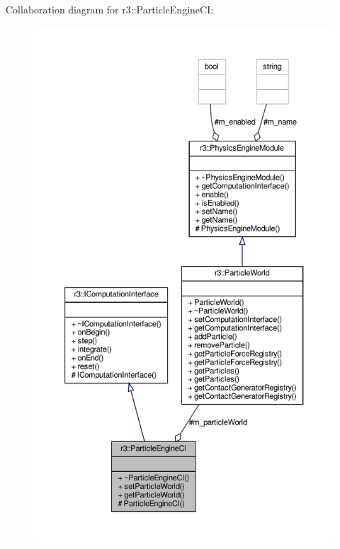 Collaboration diagram for r3\+:\+:Particle\+Engine\+CI\+:\nopagebreak
\begin{figure}[H]
\begin{center}
\leavevmode
\includegraphics[height=550pt]{classr3_1_1_particle_engine_c_i__coll__graph}
\end{center}
\end{figure}
